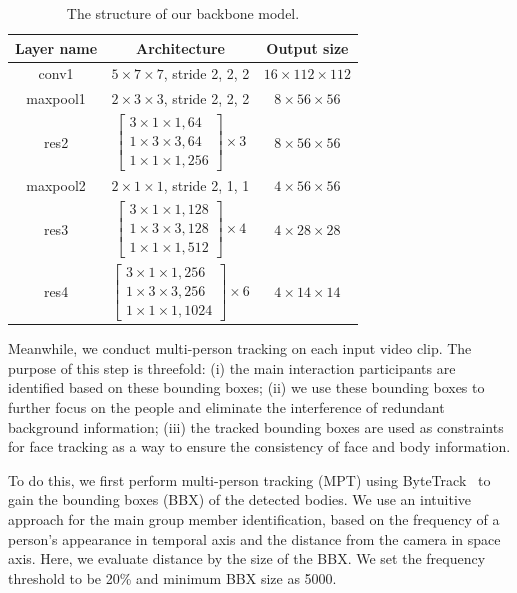 \documentclass[twocolumn]{svjour3}
\begin{document}
\begin{table}[htb]
  \centering
  \caption{The structure of our backbone model.}
  \label{t:resnet3d}
  \begin{tabular}{ccc}
  \toprule
  \textbf{Layer name} & \textbf{Architecture} & \textbf{Output size} \\
  \midrule
  conv1 & $5\times7\times7$, stride 2, 2, 2 & $16\times112\times112$ \\
  \midrule
  maxpool1 & $2\times3\times3$, stride 2, 2, 2 & $8\times56\times56$ \\
  \midrule
  res2 & $\left[ \begin{array}{c} 3\times1\times1, 64 \\ 1\times3\times3, 64 \\ 1\times1\times1, 256 \end{array}\right]\times3$ & $8\times56\times56$ \\
  \midrule
  maxpool2 & $2\times1\times1$, stride 2, 1, 1 & $4\times56\times56$ \\
  \midrule
  res3 & $\left[ \begin{array}{c} 3\times1\times1, 128 \\ 1\times3\times3, 128 \\ 1\times1\times1, 512 \end{array}\right]\times4$ & $4\times28\times28$ \\
  \midrule
  res4 & $\left[ \begin{array}{c} 3\times1\times1, 256 \\ 1\times3\times3, 256 \\ 1\times1\times1, 1024 \end{array}\right]\times6$ & $4\times14\times14$ \\
  \bottomrule
  \end{tabular}
\end{table}

Meanwhile, we conduct multi-person tracking on each input video clip. The purpose of this step is threefold: (i) the main interaction participants are identified based on these bounding boxes; (ii) we use these bounding boxes to further focus on the people and eliminate the interference of redundant background information; (iii) the tracked bounding boxes are used as constraints for face tracking as a way to ensure the consistency of face and body information.

To do this, we first perform multi-person tracking (MPT) using ByteTrack~\cite{Zhang2021ByteTrack} to gain the bounding boxes (BBX) of the detected bodies. We use an intuitive approach for the main group member identification, based on the frequency of a person's appearance in temporal axis and the distance from the camera in space axis. Here, we evaluate distance by the size of the BBX. We set the frequency threshold to be 20\% and minimum BBX size as 5000.
\end{document}
